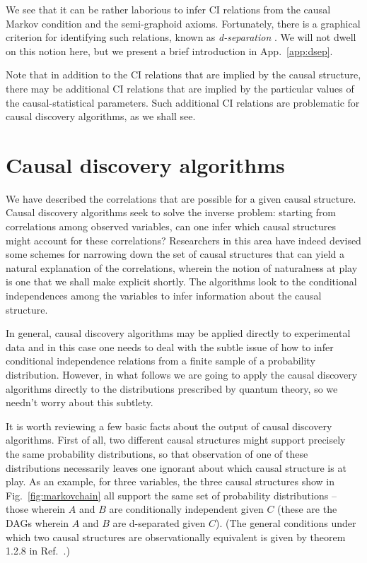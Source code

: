 \documentclass[letterpaper,onecolumn,nofootinbib]{revtex4}
\begin{document}
We see that it can be rather laborious to infer CI relations from the causal Markov condition and the semi-graphoid axioms.  Fortunately, there is a graphical criterion for identifying such relations, known as \emph{d-separation} \cite{Pearl2009}. We will not dwell on this notion here, but we present a brief introduction in App.~\ref{app:dsep}.


Note that in addition to the CI relations that are implied by the causal structure, there may be additional CI relations that are implied by the particular values of the causal-statistical parameters.   Such additional CI relations are problematic for causal discovery algorithms, as we shall see.

\section{Causal discovery algorithms}
\label{sec:causalalg}

We have described the correlations that are possible
for a given causal structure.  Causal discovery algorithms seek to solve
the inverse problem: starting from correlations among observed variables,
can one infer which causal structures might account for these correlations?
Researchers in this area have indeed devised some schemes for narrowing down
the set of causal structures that can yield a natural explanation of the
correlations, wherein the notion of naturalness at play is one that we shall
make explicit shortly.  The algorithms look to the conditional
independences among the variables to infer information about the causal structure.



In general, causal discovery algorithms may be applied directly to experimental data and in this case one needs to deal with the subtle issue of how to infer conditional independence relations from a finite sample of a probability distribution.  However, in what follows we are going to apply the causal discovery algorithms directly to the distributions prescribed by quantum theory, so we needn't worry about this subtlety.

It is worth reviewing a few basic facts about the output of causal discovery algorithms. First of all, two different causal structures might support precisely the same probability distributions, so that observation of
one of these distributions necessarily leaves one ignorant about which
causal structure is at play. As an example, for three variables, the three
causal structures show in Fig.~\ref{fig:markovchain} all support the same set of probability distributions -- those wherein $A$ and $B$ are conditionally independent given $C$ (these are the DAGs wherein $A$ and $B$ are d-separated given $C$). (The general conditions under which two causal structures are observationally equivalent is given by theorem 1.2.8 in Ref.~\cite{Pearl2009}.)
\end{document}
